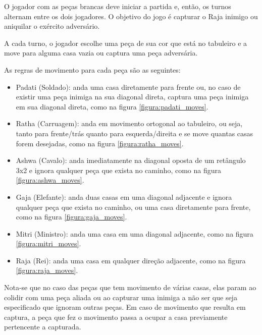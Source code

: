 \documentclass{article}
\begin{document}
    O jogador com as peças brancas deve iniciar a partida e, então, os turnos alternam entre os dois jogadores. O objetivo do jogo é capturar o Raja inimigo ou aniquilar o exército adversário.

    A cada turno, o jogador escolhe uma peça de sua cor que está no tabuleiro e a move para alguma casa vazia ou captura uma peça adversária.
    
    As regras de movimento para cada peça são as seguintes:

    \begin{itemize}
        \item Padati (Soldado): anda uma casa diretamente para frente ou, no caso de existir uma peça inimiga na sua diagonal direta, captura uma peça inimiga em sua diagonal direta, como na figura \ref{figura:padati_moves}.
        
        \item Ratha (Carruagem): anda em movimento ortogonal ao tabuleiro, ou seja, tanto para frente/trás quanto para esquerda/direita e se move quantas casas forem desejadas, como na figura \ref{figura:ratha_moves}.
        
        \item Ashwa (Cavalo): anda imediatamente na diagonal oposta de um retângulo 3x2 e ignora qualquer peça que exista no caminho, como na figura \ref{figura:ashwa_moves}.
        
        \item Gaja (Elefante): anda duas casas em uma diagonal adjacente e ignora qualquer peça que exista no caminho, ou uma casa diretamente para frente, como na figura \ref{figura:gaja_moves}.
        
        \item Mitri (Ministro): anda uma casa em uma diagonal adjacente, como na figura \ref{figura:mitri_moves}.
        
        \item Raja (Rei): anda uma casa em qualquer direção adjacente, como na figura \ref{figura:raja_moves}.
        
    \end{itemize}
    
    Nota-se que no caso das peças que tem movimento de várias casas, elas param ao colidir com uma peça aliada ou ao capturar uma inimiga a não ser que seja especificado que ignoram outras peças. Em caso de movimento que resulta em captura, a peça que fez o movimento passa a ocupar a casa previamente pertencente a capturada.
\end{document}
